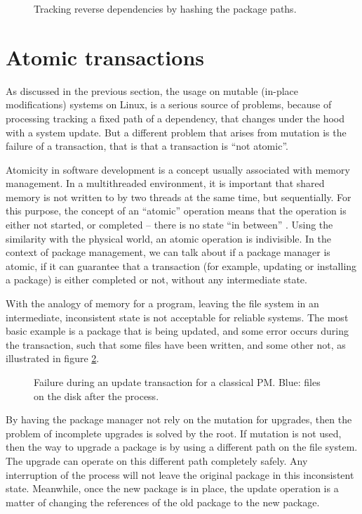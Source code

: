 \begin{figure}[hbtp]
    \centerfloat
    
    \caption{Tracking reverse dependencies by hashing the package paths.}
    \label{fig:nginx_miq}
\end{figure}

\FloatBarrier
\section{Atomic transactions}
\label{sec:atomicity}

As discussed in the previous section, the usage on mutable
(in-place modifications) systems on Linux, is a serious
source of problems, because of processing tracking a fixed
path of a dependency, that changes under the hood with a
system update. But a different problem that arises from
mutation is the failure of a transaction, that is that a
transaction is ``not atomic''.

Atomicity in software development is a concept usually
associated with memory management. In a multithreaded
environment, it is important that shared memory is not
written to by two threads at the same time, but
sequentially. For this purpose, the concept of an ``atomic''
operation means that the operation is either not started, or
completed -- there is no state ``in between''
\cite{neelakantamHardwareAtomicityReliable2007} . Using the
similarity with the physical world, an atomic operation is
indivisible.
In the context of package management, we can talk about if a
package manager is atomic, if it can guarantee that a
transaction (for example, updating or installing a package)
is either completed or not, without any intermediate state.

With the analogy of memory for a program, leaving the
file system in an intermediate, inconsistent state is not
acceptable for reliable systems. The most basic example is a
package that is being updated, and some error occurs during
the transaction, such that some files have been written, and
some other not, as illustrated in figure
\ref{fig:atomicity}.


\begin{figure}[hbt]
    \centerfloat
    
    \caption{Failure during an update transaction for a
    classical \ac{PM}. Blue: files on the disk after the process.}
    \label{fig:atomicity}
\end{figure}

By having the package manager not rely on the mutation for
upgrades, then the problem of incomplete upgrades is solved
by the root. If mutation is not used, then the way to
upgrade a package is by using a different path on the
file system. The upgrade can operate on this different path
completely safely. Any interruption of the process will not
leave the original package in this inconsistent state.
Meanwhile, once the new package is in place, the update
operation is a matter of changing the references of the old
package to the new package.

